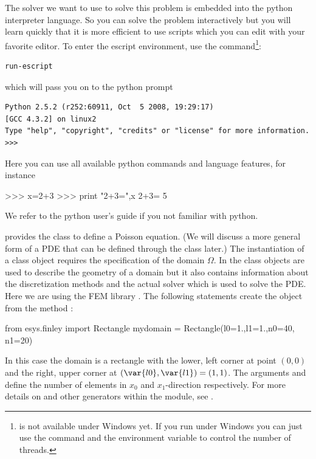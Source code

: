 The \escript solver we want to use to solve this problem is embedded into the python interpreter language.
So you can solve the problem interactively but you will learn quickly that it
is more efficient to use scripts which you can edit with your favorite editor.
To enter the escript environment, use the 
command\footnote{ is not available under Windows yet.
If you run under Windows you can just use the  command and the
 environment variable to control the number of threads.}:
\begin{verbatim}
run-escript
\end{verbatim}
which will pass you on to the python prompt
\begin{verbatim}
Python 2.5.2 (r252:60911, Oct  5 2008, 19:29:17) 
[GCC 4.3.2] on linux2
Type "help", "copyright", "credits" or "license" for more information.
>>> 
\end{verbatim}
Here you can use all available python commands and language features, for instance
\begin{python}
  >>> x=2+3
  >>> print "2+3=",x
  2+3= 5
\end{python}
We refer to the python user's guide if you not familiar with python.

\escript provides the class \Poisson to define a Poisson equation.
(We will discuss a more general form of a PDE 
that can be defined through the \LinearPDE class later.)
The instantiation of a \Poisson class object requires the specification of the domain $\Omega$.
In \escript the \Domain class objects are used to describe the geometry of a
domain but it also contains information about the discretization methods and
the actual solver which is used to solve the PDE.
Here we are using the FEM library \finley{}.
The following statements create the \Domain object  from the 
\finley method :
\begin{python}
  from esys.finley import Rectangle
  mydomain = Rectangle(l0=1.,l1=1.,n0=40, n1=20)
\end{python}
In this case the domain is a rectangle with the lower, left corner at point $(0,0)$ and
the right, upper corner at $(\var{l0},\var{l1})=(1,1)$.
The arguments  and  define the number of elements in $x_{0}$ and
$x_{1}$-direction respectively. For more details on  and
other \Domain generators within the \finley module,
see .

